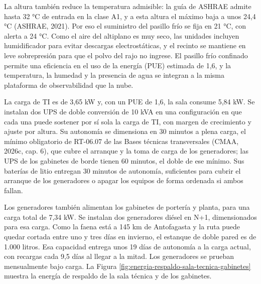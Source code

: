 \documentclass[subdoc]{../../comun/overfore}
\begin{document}
La altura también reduce la temperatura admisible: la guía de ASHRAE admite hasta 32 °C de entrada en la clase A1, y a esta altura el máximo baja a unos 24,4 °C (ASHRAE, 2021). Por eso el suministro del pasillo frío se fija en 21 °C, con alerta a 24 °C. Como el aire del altiplano es muy seco, las unidades incluyen humidificador para evitar descargas electrostáticas, y el recinto se mantiene en leve sobrepresión para que el polvo del rajo no ingrese. El pasillo frío confinado permite una eficiencia en el uso de la energía (PUE) estimada de 1,6, y la temperatura, la humedad y la presencia de agua se integran a la misma plataforma de observabilidad que la nube.

La carga de TI es de 3,65 kW y, con un PUE de 1,6, la sala consume 5,84 kW. Se instalan dos UPS de doble conversión de 10 kVA en una configuración en que cada una puede sostener por sí sola la carga de TI, con margen de crecimiento y ajuste por altura. Su autonomía se dimensiona en 30 minutos a plena carga, el mínimo obligatorio de RT-06.07 de las Bases técnicas transversales (CMAA, 2026c, cap. 6), que cubre el arranque y la toma de carga de los generadores; las UPS de los gabinetes de borde tienen 60 minutos, el doble de ese mínimo. Sus baterías de litio entregan 30 minutos de autonomía, suficientes para cubrir el arranque de los generadores o apagar los equipos de forma ordenada si ambos fallan.

Los generadores también alimentan los gabinetes de portería y planta, para una carga total de 7,34 kW. Se instalan dos generadores diésel en N+1, dimensionados para esa carga. Como la faena está a 145 km de Antofagasta y la ruta puede quedar cortada entre uno y tres días en invierno, el estanque de doble pared es de 1.000 litros. Esa capacidad entrega unos 19 días de autonomía a la carga actual, con recargas cada 9,5 días al llegar a la mitad. Los generadores se prueban mensualmente bajo carga. La Figura \ref{fig:energia-respaldo-sala-tecnica-gabinetes} muestra la energía de respaldo de la sala técnica y de los gabinetes.
\end{document}
